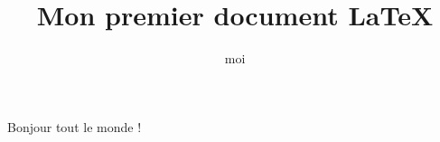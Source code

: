 \documentclass{report}
\title{Mon premier document \LaTeX}
\author{moi}
\begin{document}
\maketitle
Bonjour tout le monde !


\newpage
\end{document}
